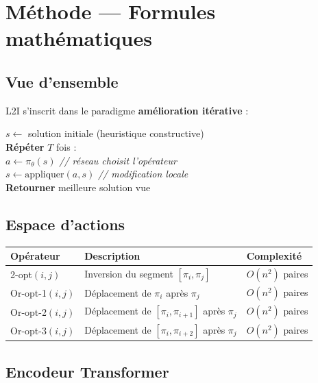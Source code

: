\documentclass[11pt,a4paper]{article}
\begin{document}
\section{Méthode --- Formules mathématiques}

\subsection{Vue d'ensemble}

L2I s'inscrit dans le paradigme \textbf{amélioration itérative} :

\begin{tcolorbox}[colback=gray!5, colframe=gray!40]
\ttfamily\small
$s \leftarrow$ solution initiale (heuristique constructive)\\
\textbf{Répéter} $T$ fois :\\
\hspace*{1em} $a \leftarrow \pi_\theta(s)$ \hfill\textit{// réseau choisit l'opérateur}\\
\hspace*{1em} $s \leftarrow \text{appliquer}(a, s)$ \hfill\textit{// modification locale}\\
\textbf{Retourner} meilleure solution vue
\end{tcolorbox}

\subsection{Espace d'actions}

\begin{center}
\begin{tabular}{lll}
  \toprule
  Opérateur & Description & Complexité \\
  \midrule
  2-opt$(i,j)$    & Inversion du segment $[\pi_i, \pi_j]$ & $O(n^2)$ paires \\
  Or-opt-1$(i,j)$ & Déplacement de $\pi_i$ après $\pi_j$ & $O(n^2)$ paires \\
  Or-opt-2$(i,j)$ & Déplacement de $[\pi_i, \pi_{i+1}]$ après $\pi_j$ & $O(n^2)$ paires \\
  Or-opt-3$(i,j)$ & Déplacement de $[\pi_i, \pi_{i+2}]$ après $\pi_j$ & $O(n^2)$ paires \\
  \bottomrule
\end{tabular}
\end{center}

\subsection{Encodeur Transformer}
\end{document}
